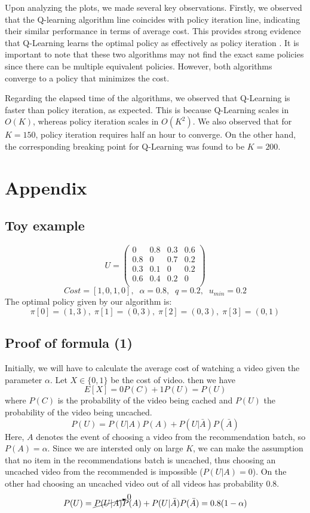 \documentclass[12pt]{article}
\begin{document}
        Upon analyzing the plots, we made several key observations. Firstly, we observed that the Q-learning algorithm line coincides with policy iteration line, indicating their similar performance in terms of average cost.
        This provides strong evidence that Q-Learning learns the optimal policy  as effectively as policy iteration . It is important to note that these two algorithms may not find the exact same policies since there can be multiple equivalent policies. However, both algorithms converge to a policy that minimizes the cost.

        Regarding the elapsed time of the algorithms, we observed that Q-Learning is faster than policy iteration, as expected. This is because Q-Learning scales in $O(K)$, whereas policy iteration scales in $O(K^2)$. We also observed that for $K=150$, policy iteration requires half an hour to converge. On the other hand,
         the corresponding breaking point for Q-Learning was found to be $K=200$.
        \section*{Appendix}
        \subsection*{Toy example}
        
    $$U=\begin{pmatrix}
        0&0.8&0.3&0.6\\
        0.8&0&0.7&0.2\\
        0.3&0.1&0&0.2\\
        0.6&0.4&0.2&0\\
    \end{pmatrix}$$
    $$Cost = \left[1,0,1,0\right],\;\;\alpha = 0.8,\;\;q=0.2,\;\;u_{min} = 0.2$$
    The optimal policy given by our algorithm is:
    $$\pi[0] = (1,3),\;\pi[1] = (0,3),\;\pi[2] = (0,3),\;\pi[3] = (0,1)$$
    
        \subsection*{Proof of formula (1)}
        Initially, we will have to calculate the average cost of
        watching a video given the parameter $\alpha$. Let $X\in \{0,1\}$ be the cost of video. then we have
          $$E[X] = 0P(C)+1P(U)=P(U)$$
          where $P(C)$ is the probability of the video being cached and $P(U)$ the probability of the video being uncached. 
          $$P(U) = P(U|A)P(A)+ P(U|\bar{A})P(\bar{A})$$
          Here, $A$ denotes the event of choosing a video from the recommendation batch, so $P(A) =\alpha$. Since we are intersted only on large $K$, we can make the assumption that no item in the recommendations batch is uncached, thus choosing an uncached video from the recommended is impossible
          ($P(U|A) = 0$). On the other had choosing an uncached video out of all videos has probability 0.8.
          $$P(U) = \cancelto{0}{P(U|A)}P(A)+ P(U|\bar{A})P(\bar{A}) = 0.8(1-\alpha)$$
          
\end{document}
